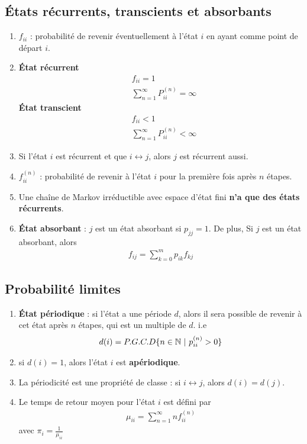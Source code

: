 \documentclass[10pt, french]{article}
\begin{document}
\begin{multicols*}{2}
\subsection*{États récurrents, transcients et absorbants}
\begin{enumerate}[label=\faAngleRight]
\item $f_{ii}$ : probabilité de revenir éventuellement à l'état $i$ en ayant comme point de départ $i$.
\item 
\begin{multicols*}{2}
\textbf{État récurrent} 
\begin{align*}
&	f_{ii} = 1 \\
&	\sum_{n = 1}^{\infty} P_{ii}^{(n)} = \infty 
\end{align*}
\newpage
\textbf{État transcient}
\begin{align*}
&	f_{ii} < 1 \\
&	\sum_{n = 1}^{\infty} P_{ii}^{(n)} < \infty 
\end{align*}
\end{multicols*}
\item Si l'état $i$ est récurrent et que $i \leftrightarrow j$, alors $j$ est récurrent aussi.
\item $f_{ii}^{(n)}$ : probabilité de revenir à l'état $i$ pour la première fois après $n$ étapes.
\item Une chaîne de Markov irréductible avec espace d'état fini \textbf{n'a que des états récurrents}.
\item \textbf{État absorbant} : $j$ est un état absorbant si $p_{jj} = 1$. De plus, Si $j$ est un état absorbant, alors
\begin{align*}
f_{ij} = \sum_{k=0}^{m} p_{ik} f_{kj}
\end{align*}
\end{enumerate}

\subsection*{Probabilité limites}
\begin{enumerate}[label=\faAngleRight]
\item \textbf{État périodique} : si l'état a une période $d$, alors il sera possible de revenir à cet état après $n$ étapes, qui est un multiple de $d$. i.e
\begin{align*}
d(i) = P.G.C.D\{n \in \mathbb{N} ~ | ~ p_{ii}^{(n)} > 0 \}
\end{align*}
\item si $d(i)=1$, alors l'état $i$ est \textbf{apériodique}.
\item La périodicité est une propriété de classe : si $i \leftrightarrow j$, alors $d(i) = d(j)$.
\item Le temps de retour moyen pour l'état $i$ est défini par
\begin{align*}
\mu_{ii} = \sum_{n=1}^{\infty} n f_{ii}^{(n)}
\end{align*}
avec $\pi_i = \frac{1}{\mu_{ii}}$


\end{enumerate}
\end{multicols*}
\end{document}
